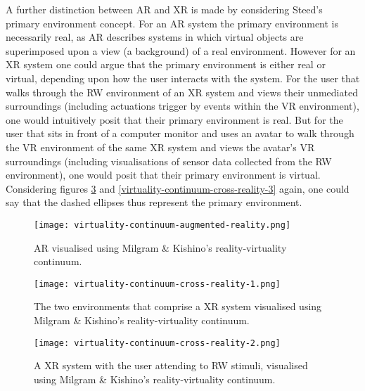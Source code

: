 A further distinction between AR and XR is made by considering Steed's primary environment concept. For an AR system the primary environment is necessarily real, as AR describes systems in which virtual objects are superimposed upon a view (a background) of a real environment. However for an XR system one could argue that the primary environment is either real or virtual, depending upon how the user interacts with the system. For the user that walks through the RW environment of an XR system and views their unmediated surroundings (including actuations trigger by events within the VR environment), one would intuitively posit that their primary environment is real. But for the user that sits in front of a computer monitor and uses an avatar to walk through the VR environment of the same XR system and views the avatar's VR surroundings (including visualisations of sensor data collected from the RW environment), one would posit that their primary environment is virtual. Considering figures \ref{virtuality-continuum-cross-reality-2} and \ref{virtuality-continuum-cross-reality-3} again, one could say that the dashed ellipses thus represent the primary environment.

\begin{figure}[h]
	\begin{center}
		\texttt{[image: virtuality-continuum-augmented-reality.png]}
		\caption{AR visualised using Milgram \& Kishino's reality-virtuality continuum.}
		\label{virtuality-continuum-augmented-reality}
	\end{center}
\end{figure}

\begin{figure}[h]
	\begin{center}
		\texttt{[image: virtuality-continuum-cross-reality-1.png]}
		\caption{The two environments that comprise a XR system visualised using Milgram \& Kishino's reality-virtuality continuum.}
		\label{virtuality-continuum-cross-reality-1}
	\end{center}
\end{figure}

\begin{figure}[h]
	\begin{center}
		\texttt{[image: virtuality-continuum-cross-reality-2.png]}
		\caption{A XR system with the user attending to RW stimuli, visualised using Milgram \& Kishino's reality-virtuality continuum.}
		\label{virtuality-continuum-cross-reality-2}
	\end{center}
\end{figure}

